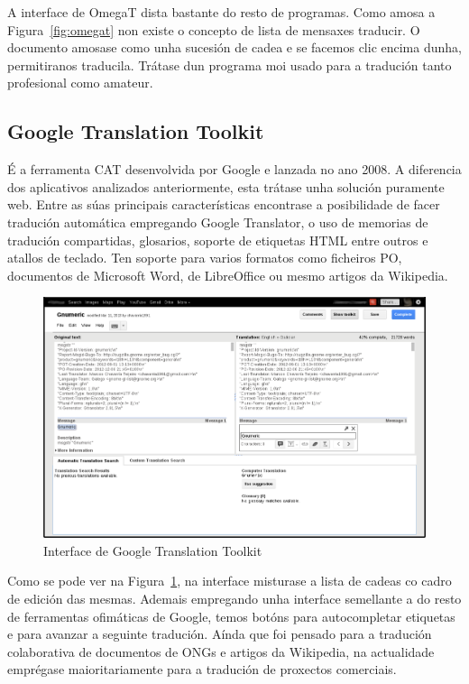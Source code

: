 A interface de OmegaT dista bastante do resto de programas. Como amosa a Figura~\ref{fig:omegat} non existe o concepto de lista de mensaxes traducir. O documento amosase como unha sucesión de cadea e se facemos clic encima dunha, permitiranos traducila. Trátase dun programa moi usado para a tradución tanto profesional como amateur.

\subsection{Google Translation Toolkit}
É a ferramenta CAT desenvolvida por Google e lanzada no ano 2008. A diferencia dos aplicativos analizados anteriormente, esta trátase unha solución puramente web. Entre as súas principais características encontrase a posibilidade de facer tradución automática empregando Google Translator, o uso de memorias de tradución compartidas, glosarios, soporte de etiquetas HTML entre outros e atallos de teclado. Ten soporte para varios formatos como ficheiros PO, documentos de Microsoft Word, de LibreOffice ou mesmo artigos da Wikipedia.

\begin{figure}[h]
    \centering
    \includegraphics[width=\textwidth]{img/captura_googletranslationtoolkit.png}
    \caption{Interface de Google Translation Toolkit}
    \label{fig:translatetoolkit}
\end{figure}

Como se pode ver na Figura~\ref{fig:translatetoolkit}, na interface misturase a lista de cadeas co cadro de edición das mesmas. Ademais empregando unha interface semellante a do resto de ferramentas ofimáticas de Google, temos botóns para autocompletar etiquetas e para avanzar a seguinte tradución. Aínda que foi pensado para a tradución colaborativa de documentos de ONGs e artigos da Wikipedia, na actualidade emprégase maioritariamente para a tradución de proxectos comerciais.


